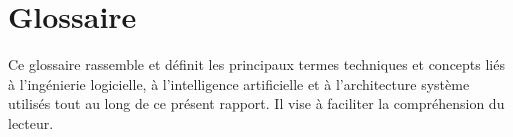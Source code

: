 \documentclass[12pt, a4paper]{report}
\begin{document}
\chapter*{Glossaire}

Ce glossaire rassemble et définit les principaux termes techniques et concepts liés à l'ingénierie logicielle, à l'intelligence artificielle et à l'architecture système utilisés tout au long de ce présent rapport. Il vise à faciliter la compréhension du lecteur.

\vspace{0.5cm}

\end{document}
